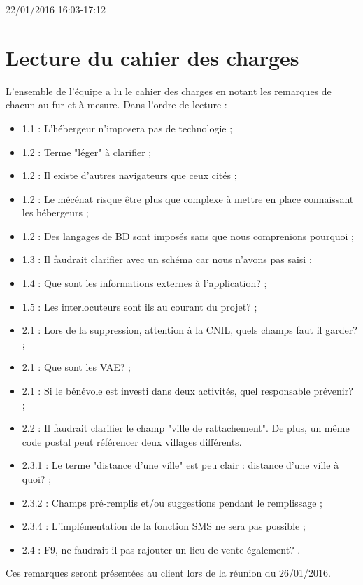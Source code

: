 \documentclass [a4paper] {article}
\begin{document}
22/01/2016			 				%
\hfill   
\hfill 	 16:03-17:12 				%






\section{Lecture du cahier des charges}
L'ensemble de l'équipe a lu le cahier des charges en notant les remarques de chacun au fur et à mesure. Dans l'ordre de lecture :
\begin{itemize}
\item 1.1 : L'hébergeur n'imposera pas de technologie ;
\item 1.2 : Terme "léger" à clarifier ;
\item 1.2 : Il existe d'autres navigateurs que ceux cités ;
\item 1.2 : Le mécénat risque être plus que complexe à mettre en place connaissant les hébergeurs ;
\item 1.2 : Des langages de BD sont imposés sans que nous comprenions pourquoi ;
\item 1.3 : Il faudrait clarifier avec un schéma car nous n'avons pas saisi ;
\item 1.4 : Que sont les informations externes à l'application? ;
\item 1.5 : Les interlocuteurs sont ils au courant du projet? ;
\item 2.1 : Lors de la suppression, attention à la CNIL, quels champs faut il garder? ;
\item 2.1 : Que sont les VAE? ;
\item 2.1 : Si le bénévole est investi dans deux activités, quel responsable prévenir? ;
\item 2.2 : Il faudrait clarifier le champ "ville de rattachement". De plus, un même code postal peut référencer deux villages différents.
\item 2.3.1 : Le terme "distance d'une ville" est peu clair : distance d'une ville à quoi? ;
\item 2.3.2 : Champs pré-remplis et/ou suggestions pendant le remplissage ;
\item 2.3.4 : L'implémentation de la fonction SMS ne sera pas possible ;
\item 2.4 : F9, ne faudrait il pas rajouter un lieu de vente également? .
\end{itemize}
Ces remarques seront présentées au client lors de la réunion du 26/01/2016.

\end{document}
